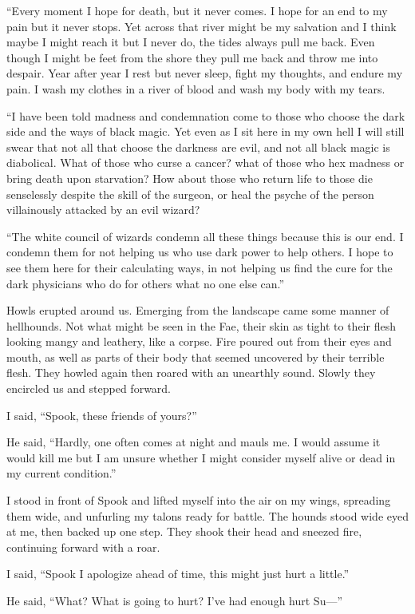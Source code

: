 ``Every moment I hope for death, but it never comes. I hope for an end to my pain but it never stops. Yet across that river might be my salvation and I think maybe I might reach it but I never do, the tides always pull me back. Even though I might be feet from the shore they pull me back and throw me into despair. Year after year I rest but never sleep, fight my thoughts, and endure my pain. I wash my clothes in a river of blood and wash my body with my tears. 

``I have been told madness and condemnation come to those who choose the dark side and the ways of black magic. Yet even as I sit here in my own hell I will still swear that not all that choose the darkness are evil, and not all black magic is diabolical. What of those who curse a cancer? what of those who hex madness or bring death upon starvation? How about those who return life to those die senselessly despite the skill of the surgeon, or heal the psyche of the person villainously attacked by an evil wizard?

``The white council of wizards condemn all these things because this is our end. I condemn them for not helping us who use dark power to help others. I hope to see them here for their calculating ways, in not helping us find the cure for the dark physicians who do for others what no one else can.''

Howls erupted around us. Emerging from the landscape came some manner of hellhounds. Not what might be seen in the Fae, their skin as tight to their flesh looking mangy and leathery, like a corpse. Fire poured out from their eyes and mouth, as well as parts of their body that seemed uncovered by their terrible flesh. They howled again then roared with an unearthly sound. Slowly they encircled us and stepped forward.

I said, ``Spook, these friends of yours?''

He said, ``Hardly, one often comes at night and mauls me. I would assume it would kill me but I am unsure whether I might consider myself alive or dead in my current condition.''

I stood in front of Spook and lifted myself into the air on my wings, spreading them wide, and unfurling my talons ready for battle. The hounds stood wide eyed at me, then backed up one step. They shook their head and sneezed fire, continuing forward with a roar.

I said, ``Spook I apologize ahead of time, this might just hurt a little.''

He said, ``What? What is going to hurt? I've had enough hurt Su---''

